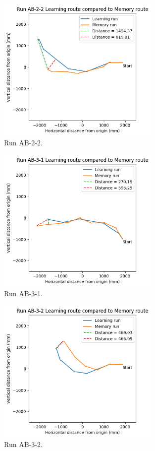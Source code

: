 \documentclass[a4paper,11pt,twoside,openright]{article}
\begin{document}
\begin{figure}[h!]
 \centering
  \includegraphics[width=0.7\textwidth]{AB-2-2}
  \caption{
    \label{fig:ab-2-2} Run AB-2-2.
  }
\end{figure}

\begin{figure}[h!]
 \centering
  \includegraphics[width=0.7\textwidth]{AB-3-1}
  \caption{
    \label{fig:ab-3-1} Run AB-3-1.
  }
\end{figure}

\begin{figure}[h!]
 \centering
  \includegraphics[width=0.7\textwidth]{AB-3-2}
  \caption{
    \label{fig:ab-3-2} Run AB-3-2.
  }
\end{figure}
\end{document}
